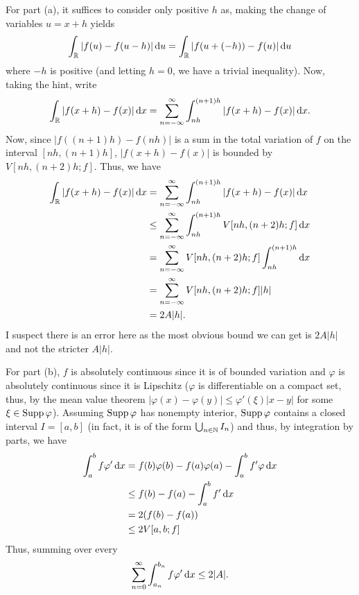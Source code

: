 \begin{solution}
  For part (a), it suffices to consider only positive \(h\) as, making the
  change of variables \(u=x+h\) yields
  \[
    \int_{\mathbb{R}} |f(u)-f(u-h)|\mathop{}\!\mathrm{d} u=
    \int_{\mathbb{R}} |f(u+(-h))-f(u)|\mathop{}\!\mathrm{d} u
  \]
  where \(-h\) is positive (and letting \(h=0\), we have a trivial
  inequality). Now, taking the hint, write
  \[
    \int_{\bbR} |f(x+h)-f(x)|\diff x=%
    \sum_{n=-\infty}^\infty\int_{nh}^{(n+1)h}|f(x+h)-f(x)|\diff x.
  \]
  Now, since \(|f((n+1)h)-f(nh)|\) is a sum in the total variation of \(f\)
  on the interval \([nh,(n+1)h]\), \(|f(x+h)-f(x)|\) is bounded by
  \(V[nh,(n+2)h;f]\). Thus, we have
  \begin{align*}
    \int_{\mathbb{R}} |f(x+h)-f(x)|\mathop{}\!\mathrm{d} x
    &=\sum_{n=-\infty}^\infty\int_{nh}^{(n+1)h}|f(x+h)-f(x)|\mathop{}\!\mathrm{d} x\\
    &\leq\sum_{n=-\infty}^\infty\int_{nh}^{(n+1)h}V[nh,(n+2)h;f]\mathop{}\!\mathrm{d} x\\
    &=\sum_{n=-\infty}^\infty V[nh,(n+2)h;f]\int_{nh}^{(n+1)h}\mathop{}\!\mathrm{d} x\\
    &=\sum_{n=-\infty}^\infty V[nh,(n+2)h;f]|h|\\
    &=2A|h|.
  \end{align*}
  I suspect there is an error here as the most obvious bound we can get is
  \(2A|h|\) and not the stricter \(A|h|\).

  For part (b), \(f\) is absolutely continuous since it is of bounded
  variation and \(\varphi\) is absolutely continuous since it is Lipschitz
  (\(\varphi\) is differentiable on a compact set, thus, by the mean value
  theorem \(|\varphi(x)-\varphi(y)|\leq \varphi'(\xi)|x-y|\) for some
  \(\xi\in\operatorname{Supp}\varphi\)). Assuming \(\operatorname{Supp}\varphi\) has nonempty interior,
  \(\operatorname{Supp}\varphi\) contains a closed interval \(I=[a,b]\) (in fact, it is
  of the form \(\bigcup_{n\in\mathbb{N}} I_n\)) and thus, by integration by
  parts, we have
  \begin{align*}
    \int_a^b f\varphi'\diff x%
    &=f(b)\varphi(b)-f(a)\varphi(a)
      -\int_a^b f'\varphi\diff x\\
    &\leq f(b)-f(a)
      -\int_a^b f'\diff x\\
    &=2(f(b)-f(a))\\
    &\leq 2V[a,b;f]
  \end{align*}
  Thus, summing over every
  \[
    \sum_{n=0}^\infty \int_{a_n}^{b_n} f\varphi'\mathop{}\!\mathrm{d} x\leq 2|A|.
  \]
\end{solution}

